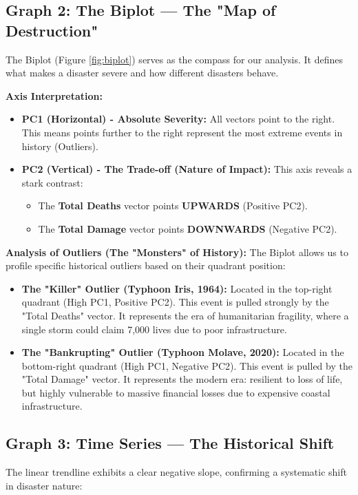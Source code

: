 \documentclass[12pt, a4paper]{report}
\begin{document}
\subsection{Graph 2: The Biplot — The "Map of Destruction"}
The Biplot (Figure \ref{fig:biplot}) serves as the compass for our analysis. It defines what makes a disaster severe and how different disasters behave.

\textbf{Axis Interpretation:}
\begin{itemize}
    \item \textbf{PC1 (Horizontal) - Absolute Severity:} All vectors point to the right. This means points further to the right represent the most extreme events in history (Outliers).
    \item \textbf{PC2 (Vertical) - The Trade-off (Nature of Impact):} This axis reveals a stark contrast:
    \begin{itemize}
        \item The \textbf{Total Deaths} vector points \textbf{UPWARDS} (Positive PC2).
        \item The \textbf{Total Damage} vector points \textbf{DOWNWARDS} (Negative PC2).
    \end{itemize}
\end{itemize}

\textbf{Analysis of Outliers (The "Monsters" of History):}
The Biplot allows us to profile specific historical outliers based on their quadrant position:
\begin{itemize}
    \item \textbf{The "Killer" Outlier (Typhoon Iris, 1964):} Located in the top-right quadrant (High PC1, Positive PC2). This event is pulled strongly by the "Total Deaths" vector. It represents the era of humanitarian fragility, where a single storm could claim 7,000 lives due to poor infrastructure.
    \item \textbf{The "Bankrupting" Outlier (Typhoon Molave, 2020):} Located in the bottom-right quadrant (High PC1, Negative PC2). This event is pulled by the "Total Damage" vector. It represents the modern era: resilient to loss of life, but highly vulnerable to massive financial losses due to expensive coastal infrastructure.
\end{itemize}

\subsection{Graph 3: Time Series — The Historical Shift}
The linear trendline exhibits a clear negative slope, confirming a systematic shift in disaster nature:
\end{document}
